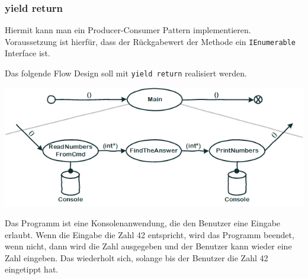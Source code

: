 
\subsubsection{yield return}

Hiermit kann man ein Producer-Consumer Pattern implementieren.
Voraussetzung ist hierfür, dass der Rückgabewert der Methode ein \texttt{IEnumerable} Interface ist.

Das folgende Flow Design soll mit \texttt{yield return} realisiert werden.



\includegraphics[width=\linewidth]{./img/FlowDesign2.png}


\bigskip
Das Programm ist eine Konsolenanwendung, die den Benutzer eine Eingabe erlaubt.
Wenn die Eingabe die Zahl 42 entspricht, wird das Programm beendet, wenn nicht,
dann wird die Zahl ausgegeben und der Benutzer kann wieder eine Zahl eingeben.
Das wiederholt sich, solange bis der Benutzer die Zahl 42 eingetippt hat.


